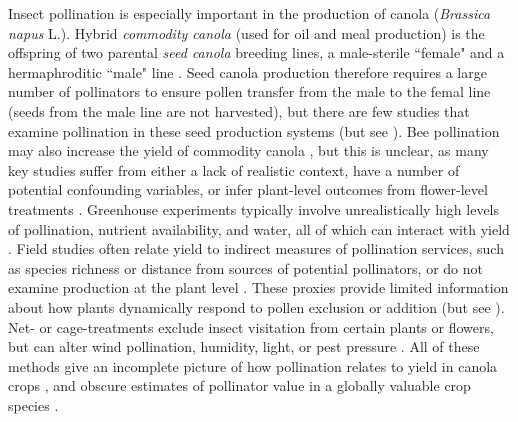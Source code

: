 \documentclass[12pt]{article} %
\begin{document}

Insect pollination is especially important in the production of canola (\textit{Brassica napus} L.).
Hybrid \emph{commodity canola} (used for oil and meal production) is the offspring of two parental \emph{seed canola} breeding lines, a male-sterile ``female" and a hermaphroditic ``male" line \citep{westcott2001,steffan2003,clay2009}. 
Seed canola production therefore requires a large number of pollinators to ensure pollen transfer from the male to the femal line (seeds from the male line are not harvested), but there are few studies that examine pollination in these seed production systems (but see \citealp{mesquida1981, mesquida1991}).
Bee pollination may also increase the yield of commodity canola \citep{morandin2005, rader_phd, bommarco2012, bartomeus2015,perrot2018}, but this is unclear, as many key studies suffer from either a lack of realistic context, have a number of potential confounding variables, or infer plant-level outcomes from flower-level treatments \citep{ouvrard2019}. 
Greenhouse experiments typically involve unrealistically high levels of pollination, nutrient availability, and water, all of which can interact with yield \citep{bartomeus2015,marini2015}.
Field studies often relate yield to indirect measures of pollination services, such as species richness or distance from sources of potential pollinators, or do not examine production at the plant level \citep{morandin2005, ricketts2008}.
These proxies provide limited information about how plants dynamically respond to pollen exclusion or addition (but see \citealp{sabbahi2005}).
Net- or cage-treatments exclude insect visitation from certain plants or flowers, but can alter wind pollination, humidity, light, or pest pressure \citep{olsson1960, neal2004, jauker2008}.
All of these methods give an incomplete picture of how pollination relates to yield in canola crops \citep{ouvrard2019}, and obscure estimates of pollinator value in a globally valuable crop species \citep{melathopoulos2015}.
\end{document}
